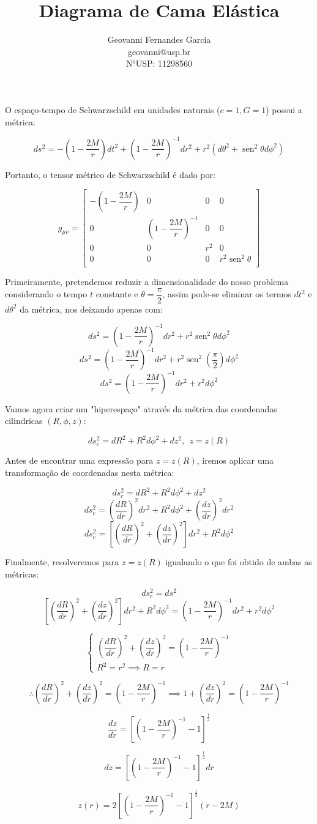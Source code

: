\documentclass[a4paper,12pt]{article}
\title{Diagrama de Cama Elástica}
\author{Geovanni Fernandes Garcia \\ geovanni@usp.br \\ N°USP: 11298560}
\DeclareMathOperator{\sen}{sen}
\newcommand{\mat}{\begin{bmatrix}}
\newcommand{\fmat}{\end{bmatrix}}
\newcommand{\sys}{\begin{cases}}
\newcommand{\fsys}{\end{cases}}
\begin{document}
\maketitle
O espaço-tempo de Schwarzschild em unidades naturais ($c = 1, G = 1$) possui a métrica:

$$ds^2 = -\left(1-\dfrac{2M}{r}\right)dt^2 + \left(1-\dfrac{2M}{r}\right)^{-1} dr^2 + r^2(d\theta^2 + \sen^2\theta d\phi^2)$$

Portanto, o tensor métrico de Schwarzschild é dado por:

$$ g_{\mu\nu } =
\mat -\left(1-\dfrac{2M}{r}\right) & 0 & 0 & 0\\
0 & \left(1-\dfrac{2M}{r}\right)^{-1} & 0 & 0\\
0 & 0 & r^2 & 0\\
0 & 0 & 0 & r^2\sen^2\theta\\
\fmat $$

Primeiramente, pretendemos reduzir a dimensionalidade do nosso problema considerando o tempo $t$ constante e $\theta = \dfrac{\pi}{2}$, assim pode-se eliminar os termos $dt^2$ e $d\theta^2$ da métrica, nos deixando apenas com:

$$ds^2 = \left(1-\dfrac{2M}{r}\right)^{-1} dr^2 + r^2\sen^2\theta d\phi^2$$
$$ds^2 = \left(1-\dfrac{2M}{r}\right)^{-1} dr^2 + r^2\sen^2\left(\dfrac{\pi}{2}\right) d\phi^2$$
$$ds^2 = \left(1-\dfrac{2M}{r}\right)^{-1} dr^2 + r^2 d\phi^2$$

Vamos agora criar um "hiperespaço" através da métrica das coordenadas cilindricas $(R,\phi,z)$:

$$ds_c^2 = dR^2 + R^2d\phi^2 + dz^2,~~z = z(R)$$

Antes de encontrar uma expressão para $z = z(R)$, iremos aplicar uma transformação de coordenadas nesta métrica:

$$ds_c^2 = dR^2 + R^2d\phi^2 + dz^2$$
$$ds_c^2 = \left(\dfrac{dR}{dr}\right)^2dr^2 + R^2d\phi^2 + \left(\dfrac{dz}{dr}\right)^2dr^2$$
$$ds_c^2 = \left[\left(\dfrac{dR}{dr}\right)^2 + \left(\dfrac{dz}{dr}\right)^2\right]dr^2 + R^2 d\phi^2$$

Finalmente, resolveremos para $z = z(R)$ igualando o que foi obtido de ambas as métricas:

$$ds_c^2 = ds^2$$
$$\left[\left(\dfrac{dR}{dr}\right)^2 + \left(\dfrac{dz}{dr}\right)^2\right]dr^2 + R^2 d\phi^2 = \left(1-\dfrac{2M}{r}\right)^{-1} dr^2 + r^2 d\phi^2$$

$$\sys \left(\dfrac{dR}{dr}\right)^2 + \left(\dfrac{dz}{dr}\right)^2 = \left(1-\dfrac{2M}{r}\right)^{-1}\\
R^2 = r^2 \implies R = r
\fsys$$

$$\therefore\left(\dfrac{dR}{dr}\right)^2 + \left(\dfrac{dz}{dr}\right)^2 = \left(1-\dfrac{2M}{r}\right)^{-1} \implies 1 + \left(\dfrac{dz}{dr}\right)^2 = \left(1-\dfrac{2M}{r}\right)^{-1}$$

$$\dfrac{dz}{dr} = \left[\left(1-\dfrac{2M}{r}\right)^{-1} - 1\right]^{\frac{1}{2}}$$

$$dz = \left[\left(1-\dfrac{2M}{r}\right)^{-1} - 1\right]^{\frac{1}{2}}dr$$

$$z(r) = 2\left[\left(1-\dfrac{2M}{r}\right)^{-1} - 1\right]^{\frac{1}{2}}(r-2M)$$
\end{document}
